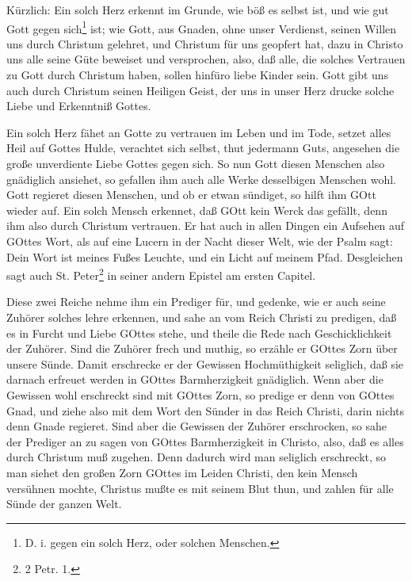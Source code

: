 Kürzlich: Ein solch Herz erkennt im Grunde, wie böß es selbst ist, und wie gut Gott gegen sich\footnote{D. i. gegen ein solch Herz, oder solchen Menschen.} ist; wie Gott, aus Gnaden, ohne unser Verdienst, seinen Willen uns durch Christum gelehret, und Christum für uns geopfert hat, dazu in Christo uns alle seine Güte beweiset und versprochen, also, daß alle, die solches Vertrauen zu Gott durch Christum haben, sollen hinfüro liebe Kinder sein. Gott gibt uns auch durch Christum seinen Heiligen Geist, der uns in unser Herz drucke solche Liebe und Erkenntniß Gottes.

Ein solch Herz fähet an Gotte zu vertrauen im Leben und im Tode, setzet alles Heil auf Gottes Hulde, verachtet sich selbst, thut jedermann Guts, angesehen die große unverdiente Liebe Gottes gegen sich. So nun Gott diesen Menschen also gnädiglich ansiehet, so gefallen ihm auch alle Werke desselbigen Menschen wohl. Gott regieret diesen Menschen, und ob er etwan sündiget, so
hilft ihm GOtt wieder auf. Ein solch Mensch erkennet, daß GOtt kein Werck das gefällt, denn ihm also durch Christum vertrauen. Er hat auch in allen Dingen ein Aufsehen auf GOttes Wort, als auf eine Lucern in der Nacht dieser Welt, wie der Psalm sagt: Dein Wort ist meines Fußes Leuchte, und ein Licht auf meinem Pfad. Desgleichen sagt auch St. Peter\footnote{2 Petr. 1.} in seiner andern Epistel am ersten Capitel.

Diese zwei Reiche nehme ihm ein Prediger für, und gedenke, wie er auch seine Zuhörer solches lehre erkennen, und sahe an vom Reich Christi zu predigen, daß es in Furcht und Liebe GOttes stehe, und theile die Rede nach Geschicklichkeit der Zuhörer. Sind die Zuhörer frech und muthig, so erzähle er GOttes Zorn über unsere Sünde. Damit erschrecke er der Gewissen Hochmüthigkeit seliglich, daß sie darnach erfreuet werden in GOttes Barmherzigkeit gnädiglich. Wenn aber die Gewissen wohl erschreckt sind mit GOttes Zorn, so predige er denn von GOttes Gnad, und ziehe also mit dem Wort den Sünder in das Reich Christi, darin nichts denn Gnade regieret. Sind aber die Gewissen der Zuhörer erschrocken, so sahe der Prediger an zu sagen von GOttes Barmherzigkeit in Christo, also, daß es alles durch Christum muß zugehen. Denn dadurch wird man seliglich erschreckt, so man siehet den großen Zorn GOttes im Leiden Christi, den kein Mensch versühnen mochte, Christus mußte es mit seinem Blut thun, und zahlen für alle Sünde der ganzen Welt.

